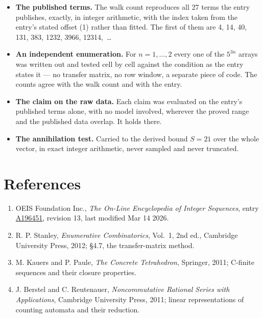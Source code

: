 \documentclass[11pt]{article}
\theoremstyle{definition}
\begin{document}
\begin{itemize}

\item {\bfseries The published terms.} The walk count reproduces all 27 terms the entry publishes, exactly, in integer arithmetic, with the index taken from the entry's stated offset (1) rather than fitted. The first of them are 4, 14, 40, 131, 383, 1232, 3966, 12314,~\dots

\item {\bfseries An independent enumeration.} For $n = 1,\dots,2$ every one of the $5^{3n}$ arrays was written out and tested cell by cell against the condition as the entry states it --- no transfer matrix, no row window, a separate piece of code. The counts agree with the walk count and with the entry.

\item {\bfseries The claim on the raw data.} Each claim was evaluated on the entry's published terms alone, with no model involved, wherever the proved range and the published data overlap. It holds there.

\item {\bfseries The annihilation test.} Carried to the derived bound $S = 21$ over the whole vector, in exact integer arithmetic, never sampled and never truncated.

\end{itemize}

\section{References}

\begin{enumerate}

\item OEIS Foundation Inc., \emph{The On-Line Encyclopedia of Integer Sequences}, entry \href{https://oeis.org/A196451}{A196451}, revision 13, last modified Mar 14 2026.

\item R. P. Stanley, \emph{Enumerative Combinatorics}, Vol.~1, 2nd ed., Cambridge University Press, 2012; \S4.7, the transfer-matrix method.

\item M. Kauers and P. Paule, \emph{The Concrete Tetrahedron}, Springer, 2011; C-finite sequences and their closure properties.

\item J. Berstel and C. Reutenauer, \emph{Noncommutative Rational Series with Applications}, Cambridge University Press, 2011; linear representations of counting automata and their reduction.

\end{enumerate}
\end{document}
